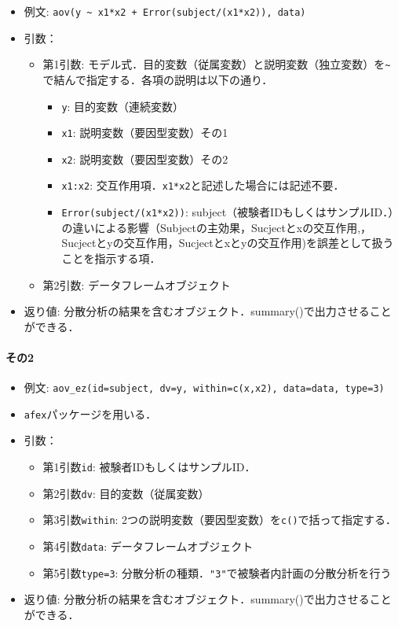 \documentclass[
  xelatex, ja=standard]{bxjsarticle}
\providecommand{\tightlist}{%
  \setlength{\itemsep}{0pt}\setlength{\parskip}{0pt}}
\begin{document}
\begin{itemize}
\tightlist
\item
  例文:
  \texttt{aov(y\ \textasciitilde{}\ x1*x2\ +\ Error(subject/(x1*x2)),\ data)}
\item
  引数：

  \begin{itemize}
  \tightlist
  \item
    第1引数:
    モデル式．目的変数（従属変数）と説明変数（独立変数）を\texttt{\textasciitilde{}}で結んで指定する．各項の説明は以下の通り．

    \begin{itemize}
    \tightlist
    \item
      \texttt{y}: 目的変数（連続変数）
    \item
      \texttt{x1}: 説明変数（要因型変数）その1
    \item
      \texttt{x2}: 説明変数（要因型変数）その2
    \item
      \texttt{x1:x2}:
      交互作用項．\texttt{x1*x2}と記述した場合には記述不要．
    \item
      \texttt{Error(subject/(x1*x2))}:
      subject（被験者IDもしくはサンプルID．）の違いによる影響（Subjectの主効果，Sucjectとxの交互作用,，Sucjectとyの交互作用，Sucjectとxとyの交互作用)を誤差として扱うことを指示する項．
    \end{itemize}
  \item
    第2引数: データフレームオブジェクト
  \end{itemize}
\item
  返り値:
  分散分析の結果を含むオブジェクト．summary()で出力させることができる．
\end{itemize}

\paragraph{その2}\label{ux305dux306e2-2}

\begin{itemize}
\tightlist
\item
  例文:
  \texttt{aov\_ez(id=subject,\ dv=y,\ within=c(x,x2),\ data=data,\ type=3)}
\item
  \texttt{afex}パッケージを用いる．
\item
  引数：

  \begin{itemize}
  \tightlist
  \item
    第1引数\texttt{id}: 被験者IDもしくはサンプルID．
  \item
    第2引数\texttt{dv}: 目的変数（従属変数）
  \item
    第3引数\texttt{within}:
    2つの説明変数（要因型変数）を\texttt{c()}で括って指定する．
  \item
    第4引数\texttt{data}: データフレームオブジェクト
  \item
    第5引数\texttt{type=3}:
    分散分析の種類．\texttt{"3"}で被験者内計画の分散分析を行う
  \end{itemize}
\item
  返り値:
  分散分析の結果を含むオブジェクト．summary()で出力させることができる．
\end{itemize}
\end{document}
